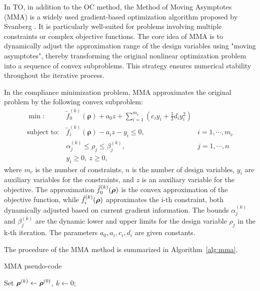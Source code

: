 \documentclass[mathpazo]{cicp}
\begin{document}
In TO, in addition to the OC method, the Method of Moving Asymptotes (MMA) is a widely used gradient-based optimization algorithm proposed by Svanberg \cite{svanberg1987method}. It is particularly well-suited for problems involving multiple constraints or complex objective functions. The core idea of MMA is to dynamically adjust the approximation range of the design variables using "moving asymptotes", thereby transforming the original nonlinear optimization problem into a sequence of convex subproblems. This strategy ensures numerical stability throughout the iterative process.

In the compliance minimization problem, MMA approximates the original problem by the following convex subproblem:
\begin{equation*}
	\begin{aligned}
		\min:
		&~\tilde{f}_0^{(k)}(\boldsymbol{\rho}) + a_0z + \sum_{i=1}^{m_c}(c_iy_i+\frac{1}{2}d_iy_i^2)\\
		\text{subject~to}:
		&~\tilde{f}_i^{(k)}(\boldsymbol{\rho}) - a_iz - y_i \leq 0,\quad&i=1,\cdots,m_c\\
		&~\alpha_j^{(k)}\leq{\rho}_j\leq\beta_j^{(k)},\quad&j=1,\cdots,n\\
		&~{y}_i\geq0,~z\geq0,
	\end{aligned}
\end{equation*}
where $m_c$ is the number of constraints, $n$ is the number of design variables, $y_i$ are auxiliary variables for the constraints, and $z$ is an auxiliary variable for the objective. The approximation $\tilde{f}_0^{(k)}(\boldsymbol{\rho})$ is the convex approximation of the objective function, while $\tilde{f}_i^{(k)}(\boldsymbol{\rho})$ approximates the i-th constraint, both dynamically adjusted based on current gradient information. The bounds $\alpha_j^{(k)}$ and $\beta_j^{(k)}$ are the dynamic lower and upper limits for the design variable $\rho_j$ in the k-th iteration. The parameters $a_0, a_i, c_i, d_i$ are given constants. 

The procedure of the MMA method is summarized in Algorithm~\ref{alg:mma}.
\begin{algorithm}[htbp]
	\caption{MMA pseudo-code}
	\label{alg:mma}
	\begin{minipage}{\textwidth}
		Set \(\boldsymbol{\rho}^{(k)} \leftarrow \boldsymbol{\rho}^{(0)}\), \(k \leftarrow 0\);
		
	\end{minipage}
\end{algorithm}
\end{document}
